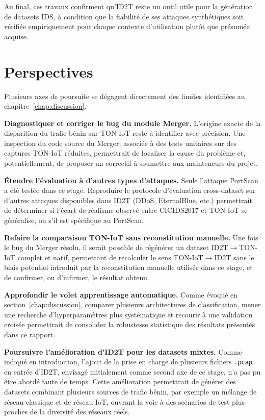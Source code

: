 \documentclass[12pt, a4paper]{report}
\begin{document}
Au final, ces travaux confirment qu'ID2T reste un outil utile pour la
génération de datasets IDS, à condition que la fiabilité de ses
attaques synthétiques soit vérifiée empiriquement pour chaque contexte
d'utilisation plutôt que présumée acquise.
 
\section{Perspectives}
 
Plusieurs axes de poursuite se dégagent directement des limites
identifiées au chapitre~\ref{chap:discussion}.
 
\textbf{Diagnostiquer et corriger le bug du module Merger.} L'origine
exacte de la disparition du trafic bénin sur TON-IoT reste à identifier
avec précision. Une inspection du code source du Merger, associée à des
tests unitaires sur des captures TON-IoT réduites, permettrait de
localiser la cause du problème et, potentiellement, de proposer un
correctif à soumettre aux mainteneurs du projet.
 
\textbf{Étendre l'évaluation à d'autres types d'attaques.} Seule
l'attaque PortScan a été testée dans ce stage. Reproduire le protocole
d'évaluation cross-dataset sur d'autres attaques disponibles dans
ID2T (DDoS, EternalBlue, etc.) permettrait de déterminer si l'écart de
réalisme observé entre CICIDS2017 et TON-IoT se généralise, ou s'il est
spécifique au PortScan.
 
\textbf{Refaire la comparaison TON-IoT sans reconstitution manuelle.}
Une fois le bug du Merger résolu, il serait possible de régénérer un
dataset ID2T$\rightarrow$TON-IoT complet et natif, permettant de
recalculer le sens TON-IoT$\rightarrow$ID2T sans le biais potentiel
introduit par la reconstitution manuelle utilisée dans ce stage, et de
confirmer, ou d'infirmer, le résultat obtenu.
 
\textbf{Approfondir le volet apprentissage automatique.} Comme évoqué
en section~\ref{chap:discussion}, comparer plusieurs architectures de
classification, mener une recherche d'hyperparamètres plus systématique
et recourir à une validation croisée permettrait de consolider la
robustesse statistique des résultats présentés dans ce rapport.
 
\textbf{Poursuivre l'amélioration d'ID2T pour les datasets mixtes.}
Comme indiqué en introduction, l'ajout de la prise en charge de
plusieurs fichiers \texttt{.pcap} en entrée d'ID2T, envisagé initialement
comme second axe de ce stage, n'a pas pu être abordé faute de temps.
Cette amélioration permettrait de générer des datasets combinant
plusieurs sources de trafic bénin, par exemple un mélange de réseau
classique et de réseau IoT, ouvrant la voie à des scénarios de test
plus proches de la diversité des réseaux réels.
 
\end{document}
